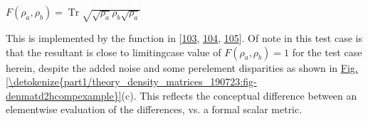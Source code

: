 \documentclass[letterpaper,table,10pt,english]{jupyterBook}
\begin{document}
\sphinxAtStartPar
\(F(\rho_{a},\rho_{b})=\operatorname{Tr} {\sqrt {{\sqrt {\rho_{a}}}\rho_{b} {\sqrt {\rho_{a}}}}}\)

\sphinxAtStartPar
This is implemented by the  function in  {[}\hyperlink{cite.backmatter/bibliography:id705}{103}, \hyperlink{cite.backmatter/bibliography:id706}{104}, \hyperlink{cite.backmatter/bibliography:id831}{105}{]}. Of note in this test case is that the resultant is close to limiting\sphinxhyphen{}case value of \(F(\rho_{a},\rho_{b})=1\) for the test case herein, despite the added noise and some per\sphinxhyphen{}element disparities as shown in   \hyperref[\detokenize{part1/theory_density_matrices_190723:fig-denmatd2hcompexample}]{Fig.\@ \ref{\detokenize{part1/theory_density_matrices_190723:fig-denmatd2hcompexample}}}(c). This reflects the conceptual difference between an element\sphinxhyphen{}wise evaluation of the differences, vs. a formal scalar metric.
\end{document}
